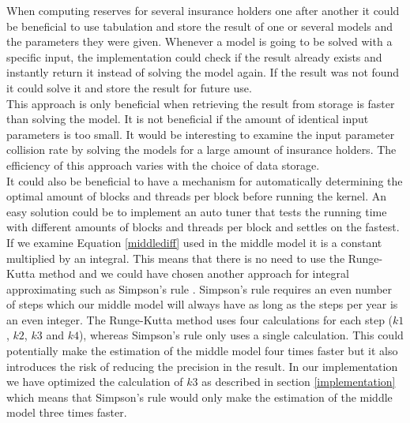 


When computing reserves for several insurance holders one after another it could be beneficial to use tabulation and store the result of one or several models and the parameters they were given. Whenever a model is going to be solved with a specific input, the implementation could check if the result already exists and instantly return it instead of solving the model again. If the result was not found it could solve it and store the result for future use. \\ 

This approach is only beneficial when retrieving the result from storage is faster than solving the model. It is not beneficial if the amount of identical input parameters is too small. It would be interesting to examine the input parameter collision rate by solving the models for a large amount of insurance holders. The efficiency of this approach varies with the choice of data storage. \\

It could also be beneficial to have a mechanism for automatically determining the optimal amount of blocks and threads per block before running the kernel. An easy solution could be to implement an auto tuner that tests the running time with different amounts of blocks and threads per block and settles on the fastest. \\

If we examine Equation \ref{middlediff} used in the middle model it is a constant multiplied by an integral. This means that there is no need to use the Runge-Kutta method and we could have chosen another approach for integral approximating such as Simpson's rule \cite{simp}. Simpson's rule requires an even number of steps which our middle model will always have as long as the steps per year is an even integer. The Runge-Kutta method uses four calculations for each step ($k1$, $k2$, $k3$ and $k4$), whereas Simpson's rule only uses a single calculation. This could potentially make the estimation of the middle model four times faster but it also introduces the risk of reducing the precision in the result. In our implementation we have optimized the calculation of $k3$ as described in section \ref{implementation} which means that Simpson's rule would only make the estimation of the middle model three times faster.

